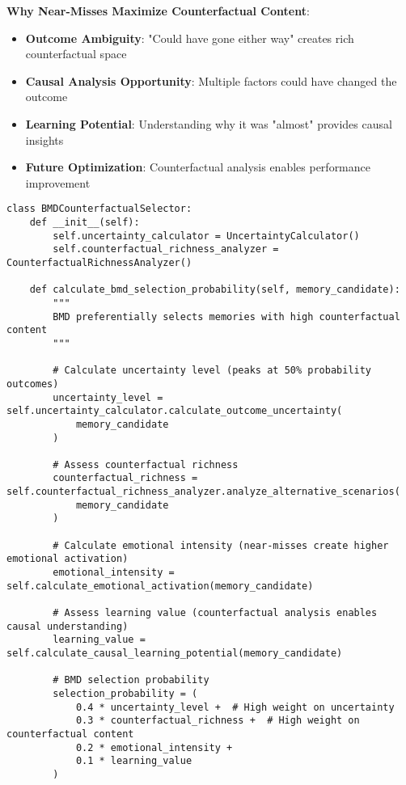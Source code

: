\documentclass[12pt,a4paper]{article}
\begin{document}
\textbf{Why Near-Misses Maximize Counterfactual Content}:
\begin{itemize}
\item \textbf{Outcome Ambiguity}: "Could have gone either way" creates rich counterfactual space
\item \textbf{Causal Analysis Opportunity}: Multiple factors could have changed the outcome
\item \textbf{Learning Potential}: Understanding why it was "almost" provides causal insights
\item \textbf{Future Optimization}: Counterfactual analysis enables performance improvement
\end{itemize}

\begin{lstlisting}[style=pythonstyle, caption=BMD Counterfactual Selection Engine]
class BMDCounterfactualSelector:
    def __init__(self):
        self.uncertainty_calculator = UncertaintyCalculator()
        self.counterfactual_richness_analyzer = CounterfactualRichnessAnalyzer()
        
    def calculate_bmd_selection_probability(self, memory_candidate):
        """
        BMD preferentially selects memories with high counterfactual content
        """
        
        # Calculate uncertainty level (peaks at 50% probability outcomes)
        uncertainty_level = self.uncertainty_calculator.calculate_outcome_uncertainty(
            memory_candidate
        )
        
        # Assess counterfactual richness
        counterfactual_richness = self.counterfactual_richness_analyzer.analyze_alternative_scenarios(
            memory_candidate
        )
        
        # Calculate emotional intensity (near-misses create higher emotional activation)
        emotional_intensity = self.calculate_emotional_activation(memory_candidate)
        
        # Assess learning value (counterfactual analysis enables causal understanding)
        learning_value = self.calculate_causal_learning_potential(memory_candidate)
        
        # BMD selection probability
        selection_probability = (
            0.4 * uncertainty_level +  # High weight on uncertainty
            0.3 * counterfactual_richness +  # High weight on counterfactual content
            0.2 * emotional_intensity +
            0.1 * learning_value
        )
        

\end{lstlisting}
\end{document}

